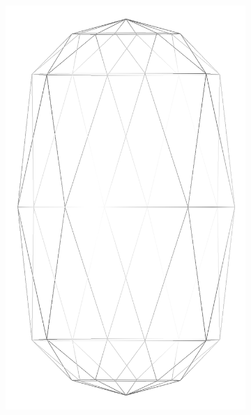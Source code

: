 \begin{figure}
  \begin{center}
    \begin{subfigure}{0.3\textwidth}
      \includegraphics[width=\textwidth]{assets/images/shapes/sphero_bug/low_2}
      \caption{}
      \label{fig:sphero_bug_low_2}
    \end{subfigure}
        \begin{subfigure}{0.3\textwidth}

\end{subfigure}
\end{center}
\end{figure}
